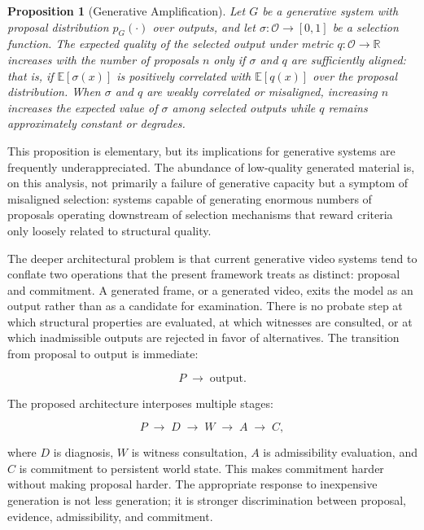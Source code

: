 \documentclass[11pt,a4paper]{article}
\theoremstyle{plain}
\newtheorem{proposition}[theorem]{Proposition}
\theoremstyle{definition}
\theoremstyle{remark}
\begin{document}
\begin{proposition}[Generative Amplification]
\label{prop:amplification}
Let $G$ be a generative system with proposal distribution $p_G(\cdot)$ over outputs, and let $\sigma: \mathcal{O} \to [0,1]$ be a selection function. The expected quality of the selected output under metric $q: \mathcal{O} \to \mathbb{R}$ increases with the number of proposals $n$ only if $\sigma$ and $q$ are sufficiently aligned: that is, if $\mathbb{E}[\sigma(x)]$ is positively correlated with $\mathbb{E}[q(x)]$ over the proposal distribution. When $\sigma$ and $q$ are weakly correlated or misaligned, increasing $n$ increases the expected value of $\sigma$ among selected outputs while $q$ remains approximately constant or degrades.
\end{proposition}

This proposition is elementary, but its implications for generative systems are frequently underappreciated. The abundance of low-quality generated material is, on this analysis, not primarily a failure of generative capacity but a symptom of misaligned selection: systems capable of generating enormous numbers of proposals operating downstream of selection mechanisms that reward criteria only loosely related to structural quality.

The deeper architectural problem is that current generative video systems tend to conflate two operations that the present framework treats as distinct: proposal and commitment. A generated frame, or a generated video, exits the model as an output rather than as a candidate for examination. There is no probate step at which structural properties are evaluated, at which witnesses are consulted, or at which inadmissible outputs are rejected in favor of alternatives. The transition from proposal to output is immediate:

\[
P \;\longrightarrow\; \text{output}.
\]

The proposed architecture interposes multiple stages:

\[
P \;\longrightarrow\; D \;\longrightarrow\; W \;\longrightarrow\; A \;\longrightarrow\; C,
\]

where $D$ is diagnosis, $W$ is witness consultation, $A$ is admissibility evaluation, and $C$ is commitment to persistent world state. This makes commitment harder without making proposal harder. The appropriate response to inexpensive generation is not less generation; it is stronger discrimination between proposal, evidence, admissibility, and commitment.
\end{document}
